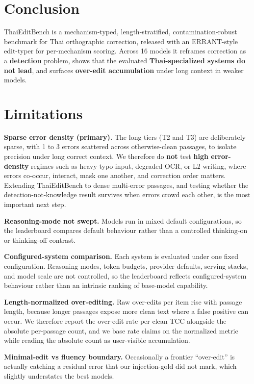 \documentclass[11pt]{article}
\begin{document}
\section{Conclusion}
ThaiEditBench is a mechanism-typed, length-stratified, contamination-robust benchmark for Thai
orthographic correction, released with an ERRANT-style edit-typer for per-mechanism scoring.
Across 16 models it reframes correction as a \textbf{detection} problem, shows that the
evaluated \textbf{Thai-specialized systems do not lead}, and surfaces \textbf{over-edit
accumulation} under long context in weaker models.

\section*{Limitations}
\textbf{Sparse error density (primary).} The long tiers (T2 and T3) are deliberately sparse,
with 1 to 3 errors scattered across otherwise-clean passages, to isolate precision under long
correct context. We therefore do \textbf{not} test \textbf{high error-density} regimes such as
heavy-typo input, degraded OCR, or L2 writing, where errors co-occur, interact, mask one
another, and correction order matters. Extending ThaiEditBench to dense multi-error passages,
and testing whether the detection-not-knowledge result survives when errors crowd each other,
is the most important next step.

\textbf{Reasoning-mode not swept.} Models run in mixed default configurations, so the
leaderboard compares default behaviour rather than a controlled thinking-on or thinking-off
contrast.

\textbf{Configured-system comparison.} Each system is evaluated under one fixed configuration.
Reasoning modes, token budgets, provider defaults, serving stacks, and model scale are not
controlled, so the leaderboard reflects configured-system behaviour rather than an intrinsic
ranking of base-model capability.

\textbf{Length-normalized over-editing.} Raw over-edits per item rise with passage length,
because longer passages expose more clean text where a false positive can occur. We therefore
report the over-edit rate per clean TCC alongside the absolute per-passage count, and we base
rate claims on the normalized metric while reading the absolute count as user-visible
accumulation.

\textbf{Minimal-edit vs fluency boundary.} Occasionally a frontier ``over-edit'' is actually
catching a residual error that our injection-gold did not mark, which slightly understates the
best models.
\end{document}
